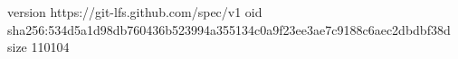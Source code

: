version https://git-lfs.github.com/spec/v1
oid sha256:534d5a1d98db760436b523994a355134c0a9f23ee3ae7c9188c6aec2dbdbf38d
size 110104
